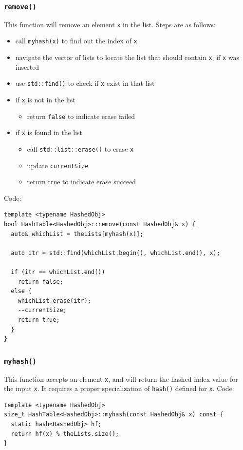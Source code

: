 \documentclass[12pt]{book}
\begin{document}
\subsubsection{\texttt{remove()}}
\label{sec:org95569d6}
This function will remove an element \texttt{x} in the list. Steps are as follows:
\begin{itemize}
\item call \texttt{myhash(x)} to find out the index of \texttt{x}
\item navigate the vector of lists to locate the list that should contain \texttt{x}, if \texttt{x} was inserted
\item use \texttt{std::find()} to check if \texttt{x} exist in that list
\item if \texttt{x} is not in the list
\begin{itemize}
\item return \texttt{false} to indicate erase failed
\end{itemize}
\item if \texttt{x} is found in the list
\begin{itemize}
\item call \texttt{std::list::erase()} to erase \texttt{x}
\item update \texttt{currentSize}
\item return true to indicate erase succeed
\end{itemize}
\end{itemize}

Code:
\begin{verbatim}
template <typename HashedObj>
bool HashTable<HashedObj>::remove(const HashedObj& x) {
  auto& whichList = theLists[myhash(x)];

  auto itr = std::find(whichList.begin(), whichList.end(), x);

  if (itr == whichList.end())
    return false;
  else {
    whichList.erase(itr);
    --currentSize;
    return true;
  }
}
\end{verbatim}

\subsubsection{\texttt{myhash()}}
\label{sec:org6ef6475}
This function accepts an element \texttt{x}, and will return the hashed index value for the input \texttt{x}. It requires a proper specialization of \texttt{hash()} defined for \texttt{x}. Code:
\begin{verbatim}
template <typename HashedObj>
size_t HashTable<HashedObj>::myhash(const HashedObj& x) const {
  static hash<HashedObj> hf;
  return hf(x) % theLists.size();
}
\end{verbatim}
\end{document}
